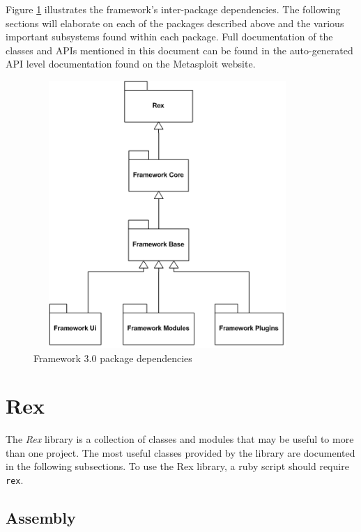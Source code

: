 \documentclass{report}
\begin{document}
\par
Figure \ref{fig-arch-pkg} illustrates the framework's inter-package
dependencies.  The following sections will elaborate on each of the
packages described above and the various important subsystems found
within each package.  Full documentation of the classes and APIs
mentioned in this document can be found in the auto-generated API
level documentation found on the Metasploit website.

\begin{figure}[h]
\begin{center}
\includegraphics[height=4in,width=4in]{dev_guide_arch_packages}
\caption{Framework 3.0 package dependencies} \label{fig-arch-pkg}
\end{center}
\end{figure}

\chapter{Rex}

\par
The \textit{Rex} library is a collection of classes and modules that
may be useful to more than one project.  The most useful classes
provided by the library are documented in the following subsections.
To use the Rex library, a ruby script should require \texttt{rex}.

    \section{Assembly}
\end{document}
